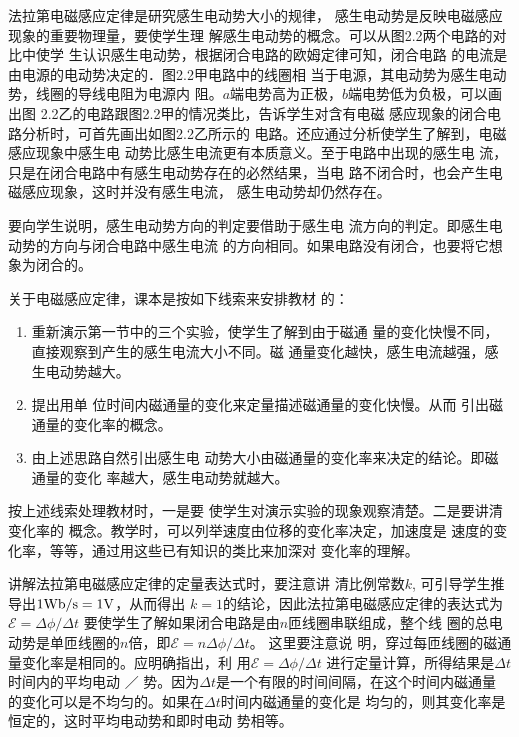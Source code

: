 法拉第电磁感应定律是研究感生电动势大小的规律，
感生电动势是反映电磁感应现象的重要物理量，要使学生理
解感生电动势的概念。可以从图2.2两个电路的对比中使学
生认识感生电动势，根据闭合电路的欧姆定律可知，闭合电路
的电流是由电源的电动势决定的．图2.2甲电路中的线圈相
当于电源，其电动势为感生电动势，线圈的导线电阻为电源内
阻。$a$端电势高为正极，$b$端电势低为负极，可以画出图
2.2乙的电路跟图2.2甲的情况类比，告诉学生对含有电磁
感应现象的闭合电路分析时，可首先画出如图2.2乙所示的
电路。还应通过分析使学生了解到，电磁感应现象中感生电
动势比感生电流更有本质意义。至于电路中出现的感生电
流，只是在闭合电路中有感生电动势存在的必然结果，当电
路不闭合时，也会产生电磁感应现象，这时并没有感生电流，
感生电动势却仍然存在。

要向学生说明，感生电动势方向的判定要借助于感生电
流方向的判定。即感生电动势的方向与闭合电路中感生电流
的方向相同。如果电路没有闭合，也要将它想象为闭合的。

关于电磁感应定律，课本是按如下线索来安排教材
的：
\begin{enumerate}
\item 重新演示第一节中的三个实验，使学生了解到由于磁通
量的变化快慢不同，直接观察到产生的感生电流大小不同。磁
通量变化越快，感生电流越强，感生电动势越大。    \item 提出用单
位时间内磁通量的变化来定量描述磁通量的变化快慢。从而
引出磁通量的变化率的概念。    \item 由上述思路自然引出感生电
动势大小由磁通量的变化率来决定的结论。即磁通量的变化
率越大，感生电动势就越大。
\end{enumerate}
按上述线索处理教材时，一是要
使学生对演示实验的现象观察清楚。二是要讲清变化率的
概念。教学时，可以列举速度由位移的变化率决定，加速度是
速度的变化率，等等，通过用这些已有知识的类比来加深对
变化率的理解。

讲解法拉第电磁感应定律的定量表达式时，要注意讲
清比例常数$k$, 可引导学生推导出$1{\rm Wb/s}=1{\rm V}$，从而得出
$k=1$的结论，因此法拉第电磁感应定律的表达式为$\mathcal{E}=\Delta\phi/\Delta t$
要使学生了解如果闭合电路是由$n$匝线圈串联组成，整个线
圈的总电动势是单匝线圈的$n$倍，即$\mathcal{E}=n\Delta\phi/\Delta t$。
这里要注意说
明，穿过每匝线圈的磁通量变化率是相同的。应明确指出，利
用$\mathcal{E}=\Delta\phi/\Delta t$
进行定量计算，所得结果是$\Delta t$时间内的平均电动
／
势。因为$\Delta t$是一个有限的时间间隔，在这个时间内磁通量
的变化可以是不均匀的。如果在$\Delta t$时间内磁通量的变化是
均匀的，则其变化率是恒定的，这时平均电动势和即时电动
势相等。


